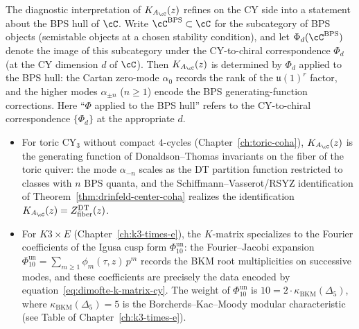 \begin{remark}
The diagnostic interpretation of $K_{A_\cC}(z)$ refines on the CY side into a statement about the BPS hull of $\cC$. Write $\cC^{\mathrm{BPS}} \subset \cC$ for the subcategory of BPS objects (semistable objects at a chosen stability condition), and let $\Phi_d(\cC^{\mathrm{BPS}})$ denote the image of this subcategory under the CY-to-chiral correspondence $\Phi_d$ (at the CY dimension $d$ of $\cC$). Then $K_{A_\cC}(z)$ is determined by $\Phi_d$ applied to the BPS hull: the Cartan zero-mode $\alpha_0$ records the rank of the $\mathfrak{u}(1)^r$ factor, and the higher modes $\alpha_{\pm n}$ ($n \geq 1$) encode the BPS generating-function corrections. Here ``$\Phi$ applied to the BPS hull'' refers to the CY-to-chiral correspondence $\{\Phi_d\}$ at the appropriate $d$.
\begin{itemize}
\item For toric CY$_3$ without compact $4$-cycles (Chapter~\ref{ch:toric-coha}), $K_{A_\cC}(z)$ is the generating function of Donaldson--Thomas invariants on the fiber of the toric quiver: the mode $\alpha_{-n}$ scales as the DT partition function restricted to classes with $n$ BPS quanta, and the Schiffmann--Vasserot/RSYZ identification of Theorem~\ref{thm:drinfeld-center-coha} realizes the identification $K_{A_\cC}(z) = Z^{\mathrm{DT}}_{\mathrm{fiber}}(z)$.
\item For $K3 \times E$ (Chapter~\ref{ch:k3-times-e}), the $K$-matrix specializes to the Fourier coefficients of the Igusa cusp form $\Phi_{10}^{\mathrm{un}}$: the Fourier--Jacobi expansion $\Phi_{10}^{\mathrm{un}} = \sum_{m \geq 1} \phi_m(\tau,z)\, p^m$ records the BKM root multiplicities on successive modes, and these coefficients are precisely the data encoded by equation~\eqref{eq:dimofte-k-matrix-cy}. The weight of $\Phi_{10}^{\mathrm{un}}$ is $10 = 2 \cdot \kappa_{\mathrm{BKM}}(\Delta_5)$, where $\kappa_{\mathrm{BKM}}(\Delta_5) = 5$ is the Borcherds--Kac--Moody modular characteristic (see Table of Chapter~\ref{ch:k3-times-e}).
\end{itemize}


\end{remark}
